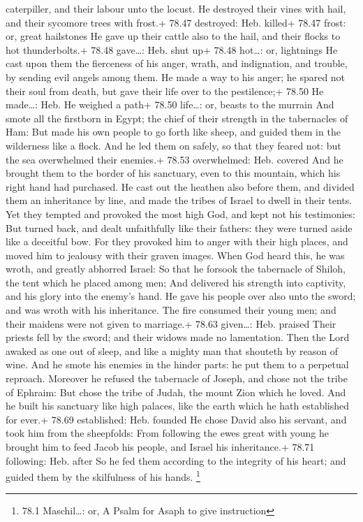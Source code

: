 caterpiller, and their labour unto the locust.  He
destroyed their vines with hail, and their sycomore trees with frost.+
78.47 destroyed: Heb. killed+ 78.47 frost: or, great hailstones
 He gave up their cattle also to the hail, and their flocks
to hot thunderbolts.+ 78.48 gave\ldots: Heb. shut up+ 78.48 hot\ldots:
or, lightnings  He cast upon them the fierceness of his
anger, wrath, and indignation, and trouble, by sending evil angels among
them.  He made a way to his anger; he spared not their soul
from death, but gave their life over to the pestilence;+ 78.50 He
made\ldots: Heb. He weighed a path+ 78.50 life\ldots: or, beasts to the
murrain  And smote all the firstborn in Egypt; the chief of
their strength in the tabernacles of Ham:  But made his own
people to go forth like sheep, and guided them in the wilderness like a
flock.  And he led them on safely, so that they feared not:
but the sea overwhelmed their enemies.+ 78.53 overwhelmed: Heb. covered
 And he brought them to the border of his sanctuary, even
to this mountain, which his right hand had purchased.  He
cast out the heathen also before them, and divided them an inheritance
by line, and made the tribes of Israel to dwell in their tents.
 Yet they tempted and provoked the most high God, and kept
not his testimonies:  But turned back, and dealt
unfaithfully like their fathers: they were turned aside like a deceitful
bow.  For they provoked him to anger with their high
places, and moved him to jealousy with their graven images.
 When God heard this, he was wroth, and greatly abhorred
Israel:  So that he forsook the tabernacle of Shiloh, the
tent which he placed among men;  And delivered his strength
into captivity, and his glory into the enemy's hand.  He
gave his people over also unto the sword; and was wroth with his
inheritance.  The fire consumed their young men; and their
maidens were not given to marriage.+ 78.63 given\ldots: Heb. praised
 Their priests fell by the sword; and their widows made no
lamentation.  Then the Lord awaked as one out of sleep, and
like a mighty man that shouteth by reason of wine.  And he
smote his enemies in the hinder parts: he put them to a perpetual
reproach.  Moreover he refused the tabernacle of Joseph,
and chose not the tribe of Ephraim:  But chose the tribe of
Judah, the mount Zion which he loved.  And he built his
sanctuary like high palaces, like the earth which he hath established
for ever.+ 78.69 established: Heb. founded  He chose David
also his servant, and took him from the sheepfolds:  From
following the ewes great with young he brought him to feed Jacob his
people, and Israel his inheritance.+ 78.71 following: Heb. after
 So he fed them according to the integrity of his heart;
and guided them by the skilfulness of his hands. \footnote{78.1
  Maschil\ldots: or, A Psalm for Asaph to give instruction}

